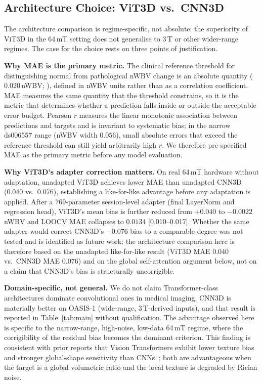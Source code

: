 \documentclass[12pt,a4paper]{article}
\begin{document}
\subsection{Architecture Choice: ViT3D vs.\ CNN3D}
\label{sec:vit_cnn_disc}

The architecture comparison is regime-specific, not absolute: the
superiority of ViT3D in the 64\,mT setting does not generalise to
3\,T or other wider-range regimes. The case for the choice rests on
three points of justification.

\textbf{Why MAE is the primary metric.}
The clinical reference threshold for distinguishing normal from
pathological nWBV change is an absolute quantity ($0.020$\,nWBV;
\cite{buckner2004}), defined in nWBV units rather than as a correlation
coefficient. MAE measures the same quantity that the threshold
constrains, so it is the metric that determines whether a prediction
falls inside or outside the acceptable error budget. Pearson $r$
measures the linear monotonic association between predictions and
targets and is invariant to systematic bias; in the narrow ds006557
range (nWBV width $0.056$), small absolute errors that exceed the
reference threshold can still yield arbitrarily high $r$. We therefore
pre-specified MAE as the primary metric before any model evaluation.

\textbf{Why ViT3D's adapter correction matters.}
On real 64\,mT hardware without adaptation, unadapted ViT3D achieves
lower MAE than unadapted CNN3D (0.040 vs.\ 0.076), establishing a
like-for-like advantage before any adaptation is applied. After a
769-parameter session-level adapter (final LayerNorm and regression
head), ViT3D's mean bias is further reduced from $+0.040$ to $-0.0022$\,nWBV
and LOOCV MAE collapses to $0.0134$ [0.010--0.017]. Whether the same
adapter would correct CNN3D's $-0.076$ bias to a comparable degree
was not tested and is identified as future work; the architecture
comparison here is therefore based on the unadapted like-for-like
result (ViT3D MAE 0.040 vs.\ CNN3D MAE 0.076) and on the global
self-attention argument below, not on a claim that CNN3D's bias is
structurally uncorrigible.

\textbf{Domain-specific, not general.}
We do not claim Transformer-class architectures dominate convolutional
ones in medical imaging. CNN3D is materially better on OASIS-1
(wide-range, 3\,T-derived inputs), and that result is reported in
Table~\ref{tab:main} without qualification. The advantage observed
here is specific to the narrow-range, high-noise, low-data 64\,mT
regime, where the corrigibility of the residual bias becomes the
dominant criterion. This finding is consistent with prior reports
that Vision Transformers exhibit lower texture bias and stronger
global-shape sensitivity than CNNs~\cite{dosovitskiy2020image}; both
are advantageous when the target is a global volumetric ratio and the
local texture is degraded by Rician noise.
\end{document}
